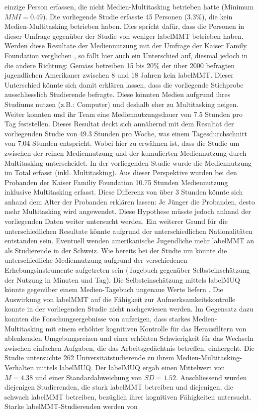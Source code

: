 einzige Person erfassen, die nicht Medien-Multitasking betrieben hatte (Minimum $MMI = 0.49$). Die vorliegende Studie erfasste 45 Personen (3.3\%), die kein Medien-Multitasking betrieben haben. Dies spricht dafür, dass die Personen in dieser Umfrage gegenüber der Studie von \citeauthor{Shih2013} weniger \gls{labelMMT} betrieben haben. Werden diese Resultate der Mediennutzung mit der Umfrage der Kaiser Family Foundation verglichen \cite{Rideout2010}, so fällt hier auch ein Unterschied auf, diesmal jedoch in die andere Richtung: Gemäss  betreiben 15 bis 20\% der über 2000 befragten jugendlichen Amerikaner zwischen 8 und 18 Jahren kein \gls{labelMMT}. Dieser Unterschied könnte sich damit erklären lassen, dass die vorliegende Stichprobe ausschliesslich Studierende befragte. Diese könnten Medien aufgrund ihres Studiums nutzen (z.B.: Computer) und deshalb eher zu Multitasking neigen. Weiter konnten  und ihr Team eine Mediennutzungsdauer von 7.5 Stunden pro Tag feststellen. Dieses Resultat deckt sich annähernd mit dem Resultat der vorliegenden Studie von 49.3 Stunden pro Woche, was einem Tagesdurchschnitt von 7.04 Stunden entspricht. Wobei hier zu erwähnen ist, dass die Studie um  zwischen der reinen Mediennutzung und der kumulierten Mediennutzung durch Multitasking unterscheidet. In der vorliegenden Studie wurde die Mediennutzung im Total erfasst (inkl. Multitasking). Aus dieser Perspektive wurden bei den Probanden der Kaiser Familiy Foundation 10.75 Stunden Mediennutzung inklusive Multitasking erfasst. Diese Differenz von über 3 Stunden könnte sich anhand dem Alter der Probanden erklären lassen: Je Jünger die Probanden, desto mehr Multitasking wird angewendet. Diese Hypothese müsste jedoch anhand der vorliegenden Daten weiter untersucht werden. Ein weiterer Grund für die unterschiedlichen Resultate könnte aufgrund der unterschiedlichen Nationalitäten entstanden sein. Eventuell wenden amerikanische Jugendliche mehr \gls{labelMMT} an als Studierende in der Schweiz. Wie bereits bei der Studie um  könnte die unterschiedliche Mediennutzung aufgrund der verschiedenen Erhebungsinstrumente aufgetreten sein (Tagebuch gegenüber Selbsteinschätzung der Nutzung in Minuten und Tag). Die Selbsteinschätzung mittels \gls{labelMUQ} könnte gegenüber einem Medien-Tagebuch ungenaue Werte liefern \cite{Greenberg2005}. Die Auswirkung von \gls{labelMMT} auf die Fähigkeit zur Aufmerksamkeitskontrolle konnte in der vorliegenden Studie nicht nachgewiesen werden. Im Gegensatz dazu konnten die Forschungsergebnisse von  aufzeigen, dass starkes Medien-Multitasking mit einem erhöhter kognitiven Kontrolle für das Herausfiltern von ablenkenden Umgebungsreizen und einer erhöhten Schwierigkeit für das Wechseln zwischen einfachen Aufgaben, die das Arbeitsgedächtnis betreffen, einhergeht. Die Studie untersuchte 262 Universitätstudierende zu ihrem Medien-Multitasking-Verhalten mittels \gls{labelMUQ}. Der \gls{labelMUQ} ergab einen Mittelwert von $M=4.38$ und einer Standardabweichung von $SD=1.52$. Anschliessend wurden diejenigen Studierenden, die stark \gls{labelMMT} betreiben und diejenigen, die schwach \gls{labelMMT} betreiben, bezüglich ihrer kognitiven Fähigkeiten untersucht. Starke \gls{labelMMT}-Studierenden werden von 